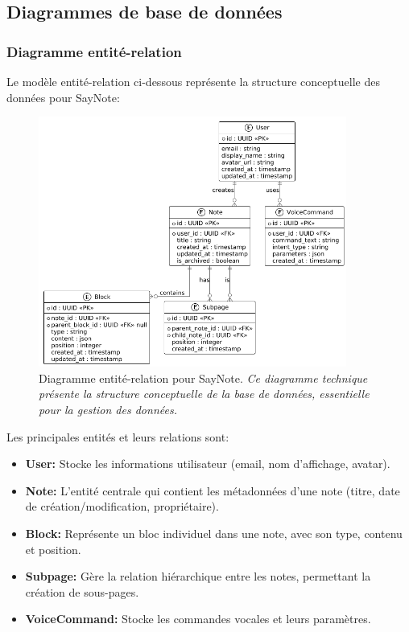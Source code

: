     \subsection{Diagrammes de base de données}
    
    \subsubsection{Diagramme entité-relation}
    
    Le modèle entité-relation ci-dessous représente la structure conceptuelle des données pour SayNote:
    
        \begin{figure}[htbp]
        \centering
        \includegraphics[width=0.9\textwidth]{assets/docs/SayNote_er_diagram.png}
        \caption{Diagramme entité-relation pour SayNote. \newline\textit{Ce diagramme technique présente la structure conceptuelle de la base de données, essentielle pour la gestion des données.}}
        \label{fig:er_diagram}
    \end{figure}
    
    Les principales entités et leurs relations sont:
    
    \begin{itemize}
        \item \textbf{User:} Stocke les informations utilisateur (email, nom d'affichage, avatar).
        
        \item \textbf{Note:} L'entité centrale qui contient les métadonnées d'une note (titre, date de création/modification, propriétaire).
        
        \item \textbf{Block:} Représente un bloc individuel dans une note, avec son type, contenu et position.
        
        \item \textbf{Subpage:} Gère la relation hiérarchique entre les notes, permettant la création de sous-pages.
        
        \item \textbf{VoiceCommand:} Stocke les commandes vocales et leurs paramètres.
    \end{itemize}
    
